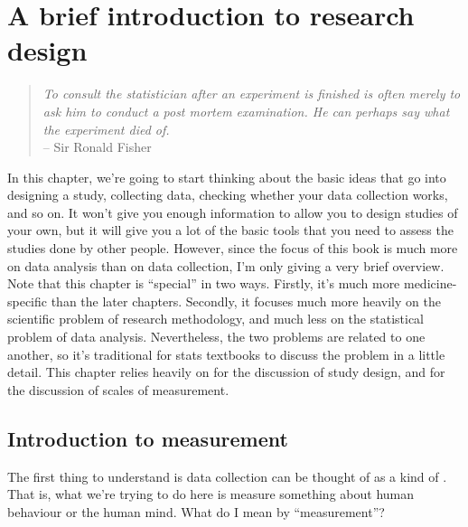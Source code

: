 

\chapter{A brief introduction to research design\label{ch:studydesign}}

\begin{quote}
{\it To consult the statistician after an experiment is finished is often merely to ask him to conduct a post mortem examination. He can perhaps say what the experiment died of.}\\
\hspace*{2cm} -- Sir Ronald Fisher
\end{quote}

In this chapter, we're going to start thinking about the basic ideas that go into designing a study, collecting data, checking whether your data collection works, and so on. It won't give you enough information to allow you to design studies of your own, but it will give you a lot of the basic tools that you need to assess the studies done by other people. However, since the focus of this book is much more on data analysis than on data collection, I'm only giving a very brief overview. Note that this chapter is ``special'' in two ways. Firstly, it's much more medicine-specific than the later chapters. Secondly, it focuses much more heavily on the scientific problem of research methodology, and much less on the statistical problem of data analysis. Nevertheless, the two problems are related to one another, so it's traditional for stats textbooks to discuss the problem in a little detail. This chapter relies heavily on \textcite{Campbell1963} for the discussion of study design, and \textcite{Stevens1946} for the discussion of scales of measurement. 

\section{Introduction to measurement~\label{sec:measurement}}

The first thing to understand is data collection can be thought of as a kind of . That is, what we're trying to do here is measure something about human behaviour or the human mind. What do I mean by ``measurement''? 

